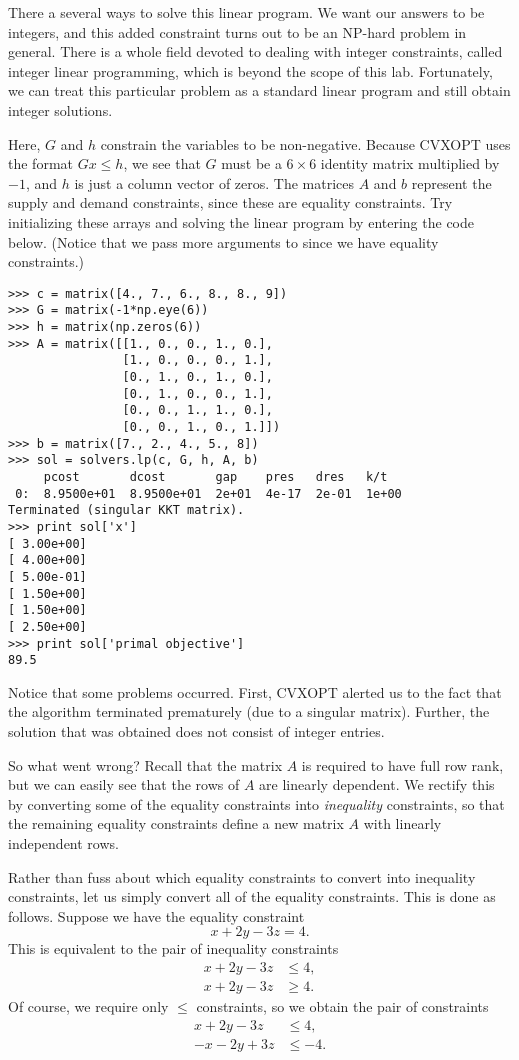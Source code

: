 There a several ways to solve this linear program. We want our answers to be integers, and this added constraint turns out to be an NP-hard problem
in general. There is a whole field devoted to dealing with integer constraints, called integer linear programming, which is beyond the scope of this lab.
Fortunately, we can treat this particular problem as a standard linear program and still obtain integer solutions.

Here, $G$ and $h$ constrain the variables to be non-negative.
Because CVXOPT uses the format $Gx \leq h$, we see that $G$ must be a $6 \times 6$ identity matrix multiplied by $-1$, and
$h$ is just a column vector of zeros.
The matrices $A$ and $b$ represent the supply and demand constraints, since these are equality constraints.
Try initializing these arrays and solving the linear program by entering the code below. (Notice that
we pass more arguments to  since we have equality constraints.)
\begin{lstlisting}
>>> c = matrix([4., 7., 6., 8., 8., 9])
>>> G = matrix(-1*np.eye(6))
>>> h = matrix(np.zeros(6))
>>> A = matrix([[1., 0., 0., 1., 0.],
                [1., 0., 0., 0., 1.],
                [0., 1., 0., 1., 0.],
                [0., 1., 0., 0., 1.],
                [0., 0., 1., 1., 0.],
                [0., 0., 1., 0., 1.]])
>>> b = matrix([7., 2., 4., 5., 8])
>>> sol = solvers.lp(c, G, h, A, b)
     pcost       dcost       gap    pres   dres   k/t
 0:  8.9500e+01  8.9500e+01  2e+01  4e-17  2e-01  1e+00
Terminated (singular KKT matrix).
>>> print sol['x']
[ 3.00e+00]
[ 4.00e+00]
[ 5.00e-01]
[ 1.50e+00]
[ 1.50e+00]
[ 2.50e+00]
>>> print sol['primal objective']
89.5
\end{lstlisting}
Notice that some problems occurred. First, CVXOPT alerted us to the fact that the algorithm terminated prematurely (due to a singular matrix).
Further, the solution that was obtained does not consist of integer entries.

So what went wrong? Recall that the matrix $A$ is required to have full row rank, but we can easily see that the rows of $A$
are linearly dependent. We rectify this by converting some of the equality constraints into \emph{inequality} constraints, so that
the remaining equality constraints define a new matrix $A$ with linearly independent rows.

Rather than fuss about which equality
constraints to convert into inequality constraints, let us simply convert all of the equality constraints.
This is done as follows. Suppose we have the equality constraint
\[
x + 2y - 3z = 4.
\]
This is equivalent to the pair of inequality
constraints
\begin{align*}
x + 2y - 3z &\leq 4, \\
x + 2y - 3z &\geq 4.
\end{align*}
Of course, we require only $\leq$ constraints, so we obtain the pair
of constraints
\begin{align*}
x + 2y - 3z &\leq 4, \\
-x - 2y + 3z &\leq -4.
\end{align*}

